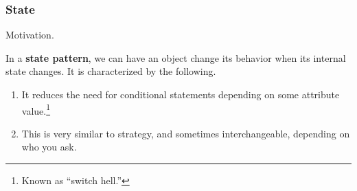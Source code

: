   \subsubsection{State} 

    Motivation. 
    
    \begin{definition}
      In a \textbf{state pattern}, we can have an object change its behavior when its internal state changes. It is characterized by the following. 
      \begin{enumerate}
        \item It reduces the need for conditional statements depending on some attribute value.\footnote{Known as ``switch hell.''}  
        \item This is very similar to strategy, and sometimes interchangeable, depending on who you ask. 
      \end{enumerate}
    \end{definition}

